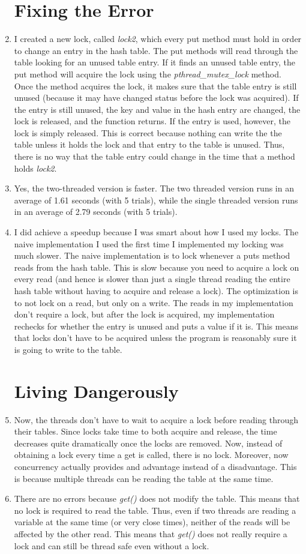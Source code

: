 \documentclass[psamsfonts]{amsart}
\begin{document}
\begin{enumerate}
    \section{Fixing the Error}
  \item I created a new lock, called \emph{lock2}, which every put method must hold in order to change an entry in the hash table. The put methods will read through the table looking for an unused table entry. If it finds an unused table entry, the put method will acquire the lock using the \emph{pthread\_mutex\_lock} method. Once the method acquires the lock, it makes sure that the table entry is still unused (because it may have changed status before the lock was acquired). If the entry is still unused, the key and value in the hash entry are changed, the lock is released, and the function returns. If the entry is used, however, the lock is simply released.
    This is correct because nothing can write the the table unless it holds the lock and that entry to the table is unused. Thus, there is no way that the table entry could change in the time that a method holds \emph{lock2}.
  \item Yes, the two-threaded version is faster. The two threaded version runs in an average of 1.61 seconds (with 5 trials), while the single threaded version runs in an average of 2.79 seconds (with 5 trials).
  \item I did achieve a speedup because I was smart about how I used my locks. The naive implementation I used the first time I implemented my locking was much slower. The naive implementation is to lock whenever a puts method reads from the hash table. This is slow because you need to acquire a lock on every read (and hence is slower than just a single thread reading the entire hash table without having to acquire and release a lock). The optimization is to not lock on a read, but only on a write. The reads in my implementation don't require a lock, but after the lock is acquired, my implementation rechecks for whether the entry is unused and puts a value if it is. This means that locks don't have to be acquired unless the program is reasonably sure it is going to write to the table.
    \section{Living Dangerously}
  \item Now, the threads don't have to wait to acquire a lock before reading through their tables. Since locks take time to both acquire and release, the time decreases quite dramatically once the locks are removed. Now, instead of obtaining a lock every time a get is called, there is no lock. Moreover, now concurrency actually provides and advantage instead of a disadvantage. This is because multiple threads can be reading the table at the same time.
  \item There are no errors because \emph{get()} does not modify the table. This means that no lock is required to read the table. Thus, even if two threads are reading a variable at the same time (or very close times), neither of the reads will be affected by the other read. This means that \emph{get()} does not really require a lock and can still be thread safe even without a lock.

\end{enumerate}
\end{document}
